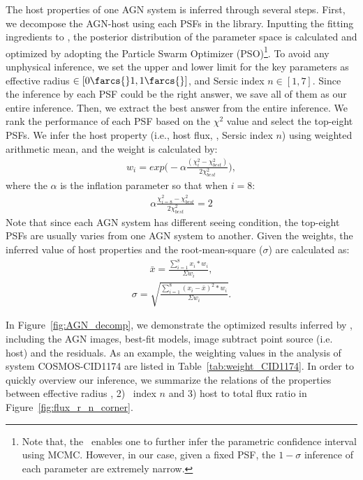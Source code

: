 \documentclass[apj]{emulateapj}
\begin{document}
The host properties of one AGN system is inferred through several steps. First, we decompose the AGN-host using each PSFs in the library. Inputting the fitting ingredients to \lenstronomy, the posterior distribution of the parameter space is calculated and optimized by adopting the Particle Swarm Optimizer (PSO)\footnote{Note that, the \lenstronomy\ enables one to further infer the parametric confidence interval using MCMC. However, in our case, given a fixed PSF, the $1-\sigma$ inference of each parameter are extremely narrow.}.
To avoid any unphysical inference, we set the upper and lower limit for the key parameters as effective radius \Reff$\in[0\farcs{}1,1\farcs{}]$, and Sersic index $n\in[1,7]$. Since the inference by each PSF could be the right answer, we save all of them as our entire inference. Then, we extract the best answer from the entire inference. We rank the performance of each PSF based on the $\chi^2$ value and select the top-eight PSFs. We infer the host property (i.e., host flux, \Reff, Sersic index $n$) using weighted arithmetic mean, and the weight is calculated by:
\begin{eqnarray}
\label{eq:weights}
w_i = exp \big(- \alpha \frac{ (\chi_i ^2 - \chi_{best} ^2 )}{2 \chi_{best} ^2} \big),
\end{eqnarray} 
where the $\alpha$ is the inflation parameter so that when $i=8$:
\begin{eqnarray}
\label{eq:alpha}
\alpha \frac{ \chi_{i=8} ^2 - \chi_{best} ^2 }{2 \chi_{best} ^2} = 2
\end{eqnarray} 
Note that since each AGN system has different seeing condition, the top-eight PSFs are usually varies from one AGN system to another. Given the weights, the inferred value of host properties and the root-mean-square ($\sigma$) are calculated as:
\begin{eqnarray}
\label{eq:infer_value}
\bar{x}  =  \frac{  \sum_{i=1}^{8}   x_i * w_i  }{\Sigma w_i} ,
\end{eqnarray} 
\begin{eqnarray}
\sigma =   \sqrt{ \frac{  \sum_{i=1}^{8}   (x_i -  \bar{x} ) ^2 * w_i  }{\Sigma w_i} }.
\end{eqnarray} 

In Figure~\ref{fig:AGN_decomp}, we demonstrate the optimized results inferred by \lenstronomy, including the AGN images, best-fit models, image subtract point source (i.e. host) and the residuals. As an example, the weighting values in the analysis of system COSMOS-CID1174 are listed in Table~\ref{tab:weight_CID1174}. In order to quickly overview our inference, we summarize the relations of the properties between effective radius \Reff, 2) \sersic\ index $n$ and 3) host to total flux ratio in Figure~\ref{fig:flux_r_n_corner}.
\end{document}
